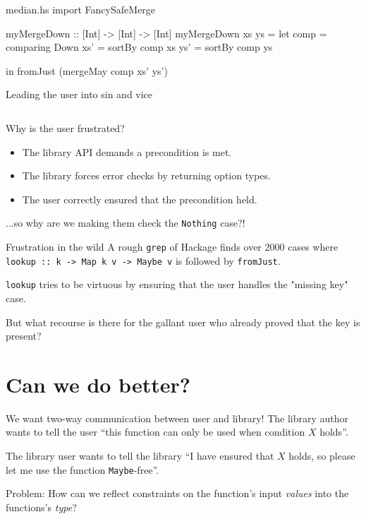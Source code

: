 \documentclass{beamer}
\begin{document}
\begin{filecontents*}{median.hs}
import FancySafeMerge

myMergeDown :: [Int] -> [Int] -> [Int]
myMergeDown xs ys =
    let comp = comparing Down
        xs' = sortBy comp xs
        ys' = sortBy comp ys

    in  fromJust (mergeMay comp xs' ys')
\end{filecontents*}
\begin{frame}{Leading the user into sin and vice}
\inputminted{haskell}{median.hs}
\end{frame}

\begin{frame}{Why is the user frustrated?}
  \begin{itemize}
    \pause\item The library API demands a precondition is met.
  \pause\item The library forces error checks by returning option types.
  \pause\item The user correctly ensured that the precondition held.
  \end{itemize}
  \pause...so why are we making them check the \texttt{Nothing} case?!
\end{frame}

\begin{frame}{Frustration in the wild}
  A rough \texttt{grep} of Hackage finds over 2000 cases where \\
  {\scriptsize\texttt{lookup :: k -> Map k v -> Maybe v}} is followed by
  {\scriptsize\texttt{fromJust}}.
  \bigskip
  
  {\scriptsize\texttt{lookup}} tries to be virtuous by ensuring that the user handles the
  "missing key" case.
  \bigskip

  But what recourse is there for the gallant user who
  already proved that the key is present?
\end{frame}

  \section{Can we do better?}   %

\begin{frame}{We want two-way communication between user and library!}
  The library author wants to tell the user ``this function can only be used when
  condition $X$ holds''.
  \bigskip
  
  The library user wants to tell the library ``I have ensured that $X$ holds, so please
  let me use the function \texttt{Maybe}-free''.
  \bigskip
  \pause
  
  \alert{Problem:} How can we reflect constraints on the function's input \emph{values} into
   the functions's \emph{type}?
\end{frame}
\end{document}
